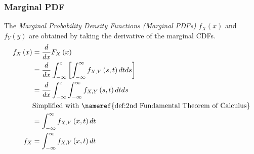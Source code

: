 		\subsubsection{Marginal PDF} \label{subsubsec:Marginal PDF}
			\begin{definition} \label{def:Marginal PDF}
				The \emph{Marginal Probability Density Functions (Marginal PDFs)} $f_{X} \left( x \right)$ and $f_{Y} \left( y \right)$ are obtained by taking the derivative of the marginal CDFs.
				\begin{equation}
					\begin{aligned}
						f_{X} \left( x \right) &= \frac{d}{dx} F_{X} \left( x \right) \\
						&= \frac{d}{dx} \int_{-\infty}^{x} \left[ \int_{-\infty}^{\infty} f_{X,Y} \left( s,t \right) dt ds \right] \\
						&= \frac{d}{dx} \int_{-\infty}^{x} \int_{-\infty}^{\infty} f_{X,Y} \left( s,t \right) dt ds \\
						&\text{Simplified with \nameref{def:2nd Fundamental Theorem of Calculus}} \\
						&= \int_{-\infty}^{\infty} f_{X,Y} \left( x,t \right) dt \\
						f_{X} &= \int_{-\infty}^{\infty} f_{X,Y} \left( x,t \right) dt \\
					\end{aligned}
				\end{equation}
			\end{definition}
